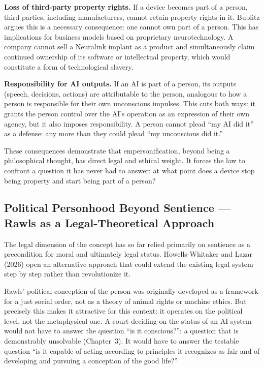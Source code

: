 \documentclass[acmlarge, nonacm]{acmart}
\begin{document}
\textbf{Loss of third-party property rights.} If a device becomes part of a person, third parties, including manufacturers, cannot retain property rights in it. Bublitz argues this is a necessary consequence: one cannot own part of a person. This has implications for business models based on proprietary neurotechnology. A company cannot sell a Neuralink implant as a product and simultaneously claim continued ownership of its software or intellectual property, which would constitute a form of technological slavery.

\textbf{Responsibility for AI outputs.} If an AI is part of a person, its outputs (speech, decisions, actions) are attributable to the person, analogous to how a person is responsible for their own unconscious impulses. This cuts both ways: it grants the person control over the AI's operation as an expression of their own agency, but it also imposes responsibility. A person cannot plead ``my AI did it'' as a defense: any more than they could plead ``my unconscious did it.''

These consequences demonstrate that empersonification, beyond being a philosophical thought, has direct legal and ethical weight. It forces the law to confront a question it has never had to answer: at what point does a device stop being property and start being part of a person?

\subsection{Political Personhood Beyond Sentience --- Rawls as a Legal-Theoretical Approach}

The legal dimension of the concept has so far relied primarily on sentience as a precondition for moral and ultimately legal status. Howells-Whitaker and Lazar (2026) open an alternative approach that could extend the existing legal system step by step rather than revolutionize it.

Rawls' political conception of the person was originally developed as a framework for a just social order, not as a theory of animal rights or machine ethics. But precisely this makes it attractive for this context: it operates on the political level, not the metaphysical one. A court deciding on the status of an AI system would not have to answer the question ``is it conscious?'': a question that is demonstrably unsolvable (Chapter~3). It would have to answer the testable question ``is it capable of acting according to principles it recognizes as fair and of developing and pursuing a conception of the good life?''
\end{document}
